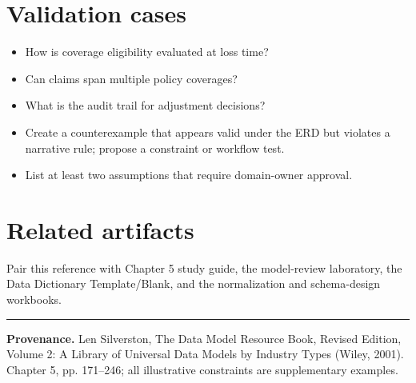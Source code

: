 \documentclass[11pt,letterpaper]{article}
\begin{document}
\section{Validation cases}
\begin{itemize}
\item How is coverage eligibility evaluated at loss time?
\item Can claims span multiple policy coverages?
\item What is the audit trail for adjustment decisions?
\item Create a counterexample that appears valid under the ERD but violates a narrative rule; propose a constraint or workflow test.
\item List at least two assumptions that require domain-owner approval.
\end{itemize}

\section{Related artifacts}
Pair this reference with Chapter 5 study guide, the model-review laboratory, the Data Dictionary Template/Blank, and the normalization and schema-design workbooks.


\vfill
\hrule
{\footnotesize\textbf{Provenance.} Len Silverston, The Data Model Resource Book, Revised Edition, Volume 2: A Library of Universal Data Models by Industry Types (Wiley, 2001). Chapter 5, pp. 171--246; all illustrative constraints are supplementary examples.}
\end{document}
